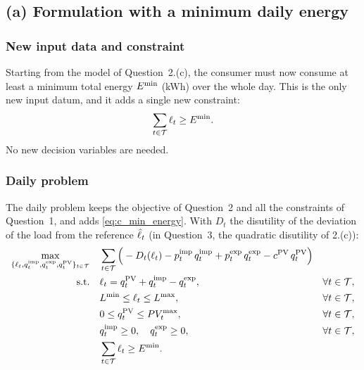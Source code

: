 %
%

\subsection{(a) Formulation with a minimum daily energy}

\subsubsection{New input data and constraint}
Starting from the model of Question~2.(c), the consumer must now consume at least a minimum
total energy $E^{\min}$ (kWh) over the whole day. This is the only new input datum, and it adds a
single new constraint:
\begin{equation}
    \sum_{t \in \mathcal{T}} \ell_{t} \geq E^{\min}.
    \label{eq:c_min_energy}
\end{equation}
No new decision variables are needed.
\subsubsection{Daily problem}
The daily problem keeps the objective of Question~2 and all the constraints of Question~1, and
adds \eqref{eq:c_min_energy}. With $D_t$ the disutility of the deviation of the load from the
reference $\hat{\ell}_{t}$ (in Question~3, the quadratic disutility of 2.(c)):
\begin{align}
    \max_{\{\ell_{t}, q^{\mathrm{imp}}_{t}, q^{\mathrm{exp}}_{t}, q^{\mathrm{PV}}_{t}\}_{t \in \mathcal{T}}} \quad
    & \sum_{t \in \mathcal{T}} \Big( - D_t(\ell_{t}) - p^{\mathrm{imp}}_{t} \, q^{\mathrm{imp}}_{t} + p^{\mathrm{exp}}_{t} \, q^{\mathrm{exp}}_{t} - c^{\mathrm{PV}} \, q^{\mathrm{PV}}_{t} \Big)
    \label{eq:q3_objective} \\
    \text{s.t.} \quad
    & \ell_{t} = q^{\mathrm{PV}}_{t} + q^{\mathrm{imp}}_{t} - q^{\mathrm{exp}}_{t}, & \forall t \in \mathcal{T}, \nonumber \\
    & L^{\min} \leq \ell_{t} \leq L^{\max}, & \forall t \in \mathcal{T}, \nonumber \\
    & 0 \leq q^{\mathrm{PV}}_{t} \leq PV_{t}^{\max}, & \forall t \in \mathcal{T}, \nonumber \\
    & q^{\mathrm{imp}}_{t} \geq 0, \quad q^{\mathrm{exp}}_{t} \geq 0, & \forall t \in \mathcal{T}, \nonumber \\
    & \sum_{t \in \mathcal{T}} \ell_{t} \geq E^{\min}. & \nonumber
\end{align}

